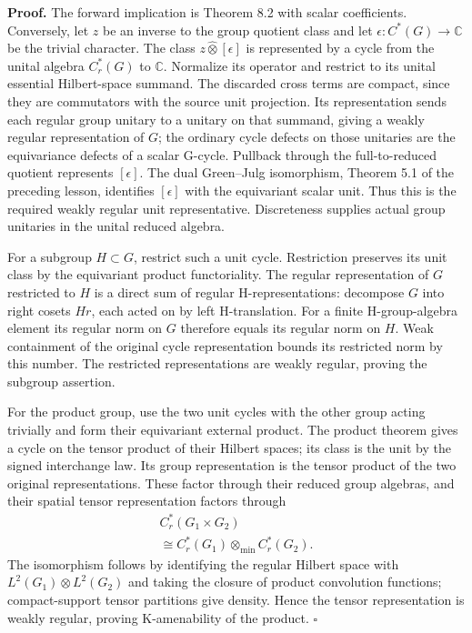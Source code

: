 \documentclass[
  11pt,
]{article}
\begin{document}
\textbf{Proof.} The forward implication is Theorem 8.2 with scalar
coefficients. Conversely, let \(z\) be an inverse to the group quotient
class and let \(\epsilon:C^*(G)\to\mathbb C\) be the trivial character.
The class \(z\widehat\otimes[\epsilon]\) is represented by a cycle from
the unital algebra \(C_r^*(G)\) to \(\mathbb C\). Normalize its operator
and restrict to its unital essential Hilbert-space summand. The
discarded cross terms are compact, since they are commutators with the
source unit projection. Its representation sends each regular group
unitary to a unitary on that summand, giving a weakly regular
representation of \(G\); the ordinary cycle defects on those unitaries
are the equivariance defects of a scalar G-cycle. Pullback through the
full-to-reduced quotient represents \([\epsilon]\). The dual Green--Julg
isomorphism, Theorem 5.1 of the preceding lesson, identifies
\([\epsilon]\) with the equivariant scalar unit. Thus this is the
required weakly regular unit representative. Discreteness supplies
actual group unitaries in the unital reduced algebra.

For a subgroup \(H\subset G\), restrict such a unit cycle. Restriction
preserves its unit class by the equivariant product functoriality. The
regular representation of \(G\) restricted to \(H\) is a direct sum of
regular H-representations: decompose \(G\) into right cosets \(Hr\),
each acted on by left H-translation. For a finite H-group-algebra
element its regular norm on \(G\) therefore equals its regular norm on
\(H\). Weak containment of the original cycle representation bounds its
restricted norm by this number. The restricted representations are
weakly regular, proving the subgroup assertion.

For the product group, use the two unit cycles with the other group
acting trivially and form their equivariant external product. The
product theorem gives a cycle on the tensor product of their Hilbert
spaces; its class is the unit by the signed interchange law. Its group
representation is the tensor product of the two original
representations. These factor through their reduced group algebras, and
their spatial tensor representation factors through \[
\begin{gathered}
C_r^*(G_1\times G_2)\\
 \cong C_r^*(G_1)\otimes_{\min}C_r^*(G_2).
\end{gathered}
\tag{8.9}
\] The isomorphism follows by identifying the regular Hilbert space with
\(L^2(G_1)\otimes L^2(G_2)\) and taking the closure of product
convolution functions; compact-support tensor partitions give density.
Hence the tensor representation is weakly regular, proving K-amenability
of the product. \(\square\)
\end{document}

